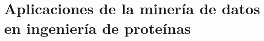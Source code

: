
\chapter{Aplicaciones de la minería de datos en ingeniería de proteínas}  %

\ifpdf
    \graphicspath{{Chapter1/Figs/Raster/}{Chapter1/Figs/PDF/}{Chapter1/Figs/}}
\else
    \graphicspath{{Chapter1/Figs/Vector/}{Chapter1/Figs/}}
\fi

